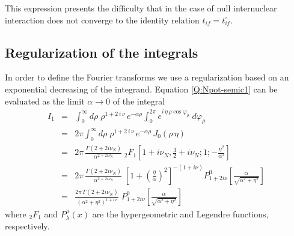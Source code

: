 This expression presents the difficulty that in the case of null internuclear
interaction does not converge to the identity relation $t_{if}=t^{\circ}_{if}$.

\subsection{Regularization of the integrals}

In order to define the Fourier transforms we use a regularization based on an
exponential decreasing of the integrand. Equation \ref{Q:Npot-semic1} can be
evaluated as the limit $\alpha \to 0$ of the integral
\begin{eqnarray}\label{Q:Npot-sreg}
I_{1} &=&\int_{0}^{\infty} d \rho \; \rho^{ 1 + 2 \, i \, \nu} \,
e^{- \alpha \rho} \int_{0}^{2 \pi} e^{i \, \eta\, \rho
\cos{\varphi_{\rho}}} \; d \varphi_{\rho} \nonumber
  \\
&=& 2 \pi \int_{0}^{\infty} d \rho \; \rho^{1 + 2 \, i \, \nu}\,
e^{- \alpha \rho} \, J_{0}(\rho \,\eta) \nonumber
  \\
&=& 2 \pi \, \frac{\Gamma \left( 2 + 2 i \nu_{N} \right)}{ \alpha^{2 + 2
i \nu_{N}}} \; _{2}F_{1}\left[ 1 + i \nu_{N}, \frac{3}{2} + i
\nu_{N} ; 1; -  \frac{\eta^{2}}{\alpha^{2}} \right] \nonumber
  \\
&=& 2 \pi \, \frac{\Gamma \left( 2 + 2 i \nu_{N} \right)}{ \alpha^{2 + 2
i \nu_{N}}} \; \left[ 1 + \left( \frac{\eta}{\alpha} \right)^{2}
\right]^{-(1+i \nu)} P^{0}_{1 + 2 i \nu} \left[
\frac{\alpha}{\sqrt{\alpha^{2}+ \eta^{2}}} \right] \nonumber
  \\
&=&  \frac{2 \pi \,\Gamma \left( 2 + 2 i \nu_{N} \right)}{
\left({\alpha^{2} + \eta^{2}} \right)^{1+i \nu}} \;  P^{0}_{1 + 2 i
\nu} \left[ \frac{\alpha}{\sqrt{\alpha^{2}+ \eta^{2}}} \right] \nonumber
\end{eqnarray}
%
where $_{2}F_{1}$ and $P^{\mu}_{\lambda}(x)$ are the hypergeometric and
Legendre functions, respectively.

